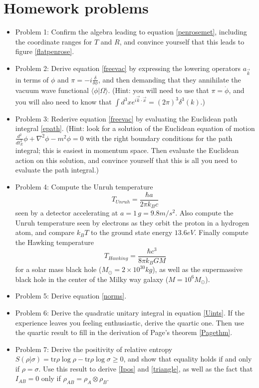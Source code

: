 \documentclass[12pt]{article}
\newcommand{\be}{\begin{equation}}
\newcommand{\ee}{\end{equation}}
\newcommand{\lan}{\langle}
\newcommand{\ran}{\rangle}
\begin{document}
\section{Homework problems}
\begin{itemize}
\item Problem 1: Confirm the algebra leading to equation \eqref{penrosemet}, including the coordinate ranges for $T$ and $R$, and convince yourself that this leads to figure \ref{flatpenrose}.
\item Problem 2: Derive equation \eqref{freevac} by expressing the lowering operators $a_{\vec{k}}$ in terms of $\phi$ and $\pi=-i\frac{\delta}{\delta\phi}$, and then demanding that they annihilate the vacuum wave functional $\lan \phi|\Omega\ran$. (Hint: you will need to use that $\pi=\dot{\phi}$, and you will also need to know that $\int d^3x e^{i \vec{k}\cdot \vec{x}}=(2\pi)^3 \delta^3(k)$.)
\item Problem 3: Rederive equation \eqref{freevac} by evaluating the Euclidean path integral \eqref{epath}.  (Hint: look for a solution of the Euclidean equation of motion $\frac{d^2}{dt_E^2}\phi+\nabla^2\phi-m^2\phi=0$ with the right boundary conditions for the path integral; this is easiest in momentum space.  Then evaluate the Euclidean action on this solution, and convince yourself that this is all you need to evaluate the path integral.)
\item Problem 4: Compute the Unruh temperature
\be
T_{\mathit{Unruh}}=\frac{\hbar a}{2\pi k_B c}
\ee
 seen by a detector accelerating at $a=1\,g =9.8 m/s^2$.  Also compute the Unruh temperature seen by electrons as they orbit the proton in a hydrogen atom, and compare $k_B T$ to the ground state energy $13.6eV$.  Finally compute the Hawking temperature 
\be
T_{\mathit{Hawking}}=\frac{\hbar c^3}{8\pi k_B G M}
\ee
for a solar mass black hole ($M_\odot=2 \times 10^{30} kg$), as well as the supermassive black hole in the center of the Milky way galaxy ($M=10^6 M_\odot$).
\item Problem 5: Derive equation \eqref{norms}.
\item Problem 6: Derive the quadratic unitary integral in equation \eqref{Uints}.  If the experience leaves you feeling enthusiastic, derive the quartic one.  Then use the quartic result to fill in the derivation of Page's theorem \eqref{Pagethm}.
\item Problem 7: Derive the positivity of relative entropy $S(\rho|\sigma)=\mathrm{tr} \rho \log \rho-\mathrm{tr} \rho \log \sigma\geq 0$, and show that equality holds if and only if $\rho=\sigma$.  Use this result to derive \eqref{Ipos} and \eqref{triangle}, as well as the fact that $I_{AB}=0$ only if $\rho_{AB}=\rho_A\otimes\rho_B$.

\end{itemize}
\end{document}

